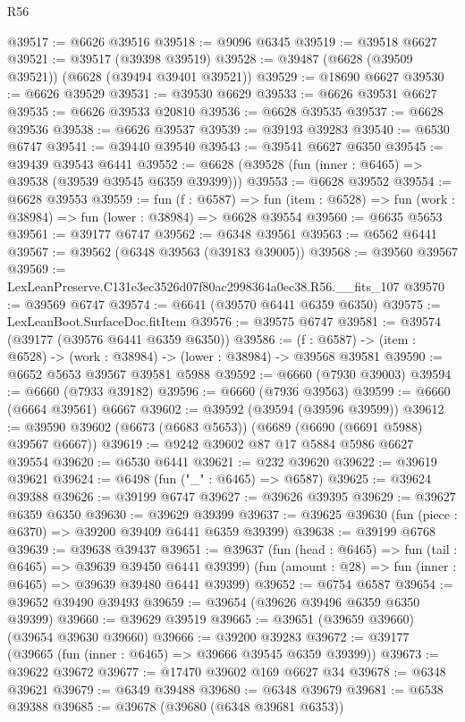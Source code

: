 \begin{lexlean}{R56}
\begin{coremodule}
@39517 := @6626 @39516
@39518 := @9096 @6345
@39519 := @39518 @6627
@39521 := @39517 (@39398 @39519)
@39528 := @39487 (@6628 (@39509 @39521)) (@6628 (@39494 @39401 @39521))
@39529 := @18690 @6627
@39530 := @6626 @39529
@39531 := @39530 @6629
@39533 := @6626 @39531 @6627
@39535 := @6626 @39533 @20810
@39536 := @6628 @39535
@39537 := @6628 @39536
@39538 := @6626 @39537
@39539 := @39193 @39283
@39540 := @6530 @6747
@39541 := @39440 @39540
@39543 := @39541 @6627 @6350
@39545 := @39439 @39543 @6441
@39552 := @6628 (@39528 (fun (inner : @6465) => @39538 (@39539 @39545 @6359 @39399)))
@39553 := @6628 @39552
@39554 := @6628 @39553
@39559 := fun (f : @6587) =>
  fun (item : @6528) => fun (work : @38984) => fun (lower : @38984) => @6628 @39554
@39560 := @6635 @5653
@39561 := @39177 @6747
@39562 := @6348 @39561
@39563 := @6562 @6441
@39567 := @39562 (@6348 @39563 (@39183 @39005))
@39568 := @39560 @39567
@39569 := LexLeanPreserve.C131e3ec3526d07f80ac2998364a0ec38.R56.__fits_107
@39570 := @39569 @6747
@39574 := @6641 (@39570 @6441 @6359 @6350)
@39575 := LexLeanBoot.SurfaceDoc.fitItem
@39576 := @39575 @6747
@39581 := @39574 (@39177 (@39576 @6441 @6359 @6350))
@39586 := (f : @6587) -> (item : @6528) -> (work : @38984) -> (lower : @38984) -> @39568 @39581
@39590 := @6652 @5653 @39567 @39581 @5988
@39592 := @6660 (@7930 @39003)
@39594 := @6660 (@7933 @39182)
@39596 := @6660 (@7936 @39563)
@39599 := @6660 (@6664 @39561) @6667
@39602 := @39592 (@39594 (@39596 @39599))
@39612 := @39590 @39602 (@6673 (@6683 @5653)) (@6689 (@6690 (@6691 @5988) @39567 @6667))
@39619 := @9242 @39602 @87 @17 @5884 @5986 @6627 @39554
@39620 := @6530 @6441
@39621 := @232 @39620
@39622 := @39619 @39621
@39624 := @6498 (fun ("_" : @6465) => @6587)
@39625 := @39624 @39388
@39626 := @39199 @6747
@39627 := @39626 @39395
@39629 := @39627 @6359 @6350
@39630 := @39629 @39399
@39637 := @39625 @39630 (fun (piece : @6370) => @39200 @39409 @6441 @6359 @39399)
@39638 := @39199 @6768
@39639 := @39638 @39437
@39651 := @39637
    (fun (head : @6465) => fun (tail : @6465) => @39639 @39450 @6441 @39399)
    (fun (amount : @28) => fun (inner : @6465) => @39639 @39480 @6441 @39399)
@39652 := @6754 @6587
@39654 := @39652 @39490 @39493
@39659 := @39654 (@39626 @39496 @6359 @6350 @39399)
@39660 := @39629 @39519
@39665 := @39651 (@39659 @39660) (@39654 @39630 @39660)
@39666 := @39200 @39283
@39672 := @39177 (@39665 (fun (inner : @6465) => @39666 @39545 @6359 @39399))
@39673 := @39622 @39672
@39677 := @17470 @39602 @169 @6627 @34
@39678 := @6348 @39621
@39679 := @6349 @39488
@39680 := @6348 @39679
@39681 := @6538 @39388
@39685 := @39678 (@39680 (@6348 @39681 @6353))

\end{coremodule}
\end{lexlean}
